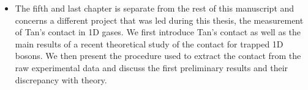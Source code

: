 \begin{itemize}
    \item The fifth and last chapter is separate from the rest of this manuscript and concerns a different project that was led during this thesis, the measurement of Tan's contact in 1D gases. We first introduce Tan's contact as well as the main results of a recent theoretical study \cite{yao2018tan} of the contact for trapped 1D bosons. We then present the procedure used to extract the contact from the raw experimental data and discuss the first preliminary results and their discrepancy with theory.
\end{itemize}









